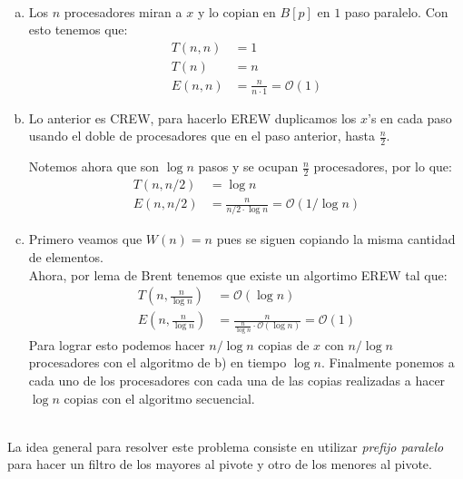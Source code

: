 \documentclass[dcc,uchile]{fcfmcourse}
\theoremstyle{plain}
\theoremstyle{definition}
\begin{document}
\begin{problems}
\\
\begin{enumerate}[a)]
\item
Los $n$ procesadores miran a $x$ y lo copian en $B[p]$ en $1$ paso paralelo.
Con esto tenemos que:
\begin{align*}
    T(n,n) &= 1\\
	T(n) &= n\\
	E(n,n) &= \frac{n}{n\cdot 1} = \mathcal{O}(1)
\end{align*}
\item 
Lo anterior es CREW, para hacerlo EREW duplicamos los $x$'s en cada paso usando el doble de procesadores que en el paso anterior, hasta $\frac{n}{2}$.\\
\begin{algorithm}[H]

\SetAlgoLined
{}
\end{algorithm}
Notemos ahora que son $\log{n}$ pasos y se ocupan $\frac{n}{2}$ procesadores, por lo que:
\begin{align*}
T(n,n/2) &= \log{n}\\
E(n,n/2) &= \frac{n}{n/2\cdot \log{n}} = \mathcal{O}(1/\log{n})
\end{align*}
\item
Primero veamos que $W(n)=n$ pues se siguen copiando la misma cantidad de elementos.\\
Ahora, por lema de Brent tenemos que existe un algortimo EREW tal que:
\begin{align*}
T\left(n,\frac{n}{\log{n}}\right) &= \mathcal{O}(\log{n})\\
E\left(n,\frac{n}{\log{n}}\right) &= \frac{n}{\frac{n}{\log{n}}\cdot \mathcal{O}(\log{n})} = \mathcal{O}(1)
\end{align*}
Para lograr esto podemos hacer $n/\log{n}$ copias de $x$ con $n/\log{n}$ procesadores con el algoritmo de b) en tiempo $\log{n}$. Finalmente ponemos a cada uno de los procesadores con cada una de las copias realizadas a hacer $\log{n}$ copias con el algoritmo secuencial.
\end{enumerate}

\\
La idea general para resolver este problema consiste en utilizar \textit{prefijo paralelo} para hacer un filtro de los mayores al pivote y otro de los menores al pivote.\\


\end{problems}
\end{document}
